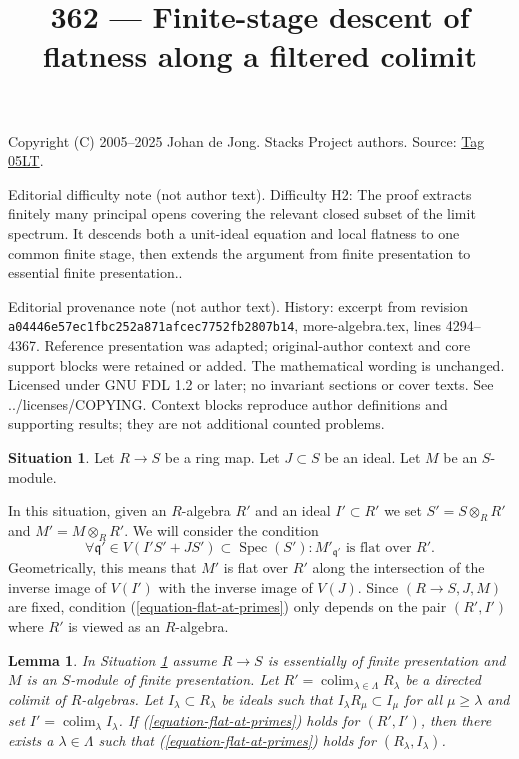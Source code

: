 \documentclass{amsart}
\theoremstyle{plain}
\newtheorem{lemma}[subsection]{Lemma}
\theoremstyle{definition}
\newtheorem{situation}[subsection]{Situation}
\theoremstyle{remark}
\numberwithin{equation}{subsection}
\def\colim{\mathop{\mathrm{colim}}\nolimits}
\def\Spec{\mathop{\mathrm{Spec}}}
\begin{document}
\title[Stacks Project, Tag 05LT]{362 --- Finite-stage descent of flatness along a filtered colimit}
\maketitle
\noindent Copyright (C) 2005--2025 Johan de Jong. Stacks Project authors. Source: \href{https://stacks.math.columbia.edu/tag/05LT}{Tag 05LT}.

\noindent Editorial difficulty note (not author text). Difficulty H2: The proof extracts finitely many principal opens covering the relevant closed subset of the limit spectrum. It descends both a unit-ideal equation and local flatness to one common finite stage, then extends the argument from finite presentation to essential finite presentation..

\noindent Editorial provenance note (not author text). History: excerpt from revision \texttt{a0444\allowbreak 6e57e\allowbreak c1fbc\allowbreak 252a8\allowbreak 71afc\allowbreak ec775\allowbreak 2fb28\allowbreak 07b14}, more-algebra.tex, lines 4294--4367. Reference presentation was adapted; original-author context and core support blocks were retained or added. The mathematical wording is unchanged. Licensed under GNU FDL 1.2 or later; no invariant sections or cover texts. See ../licenses/COPYING. Context blocks reproduce author definitions and supporting results; they are not additional counted problems.

\begin{situation}
\label{situation-flattening-general}
Let $R \to S$ be a ring map. Let $J \subset S$ be an ideal.
Let $M$ be an $S$-module.
\end{situation}

In this situation, given an $R$-algebra $R'$ and an ideal $I' \subset R'$
we set $S' = S \otimes_R R'$ and $M' = M \otimes_R R'$.
We will consider the condition
\begin{equation}
\label{equation-flat-at-primes}
\forall \mathfrak q' \in V(I'S' + JS') \subset \Spec(S') :
M'_{\mathfrak q'}\text{ is flat over }R'.
\end{equation}
Geometrically, this means that $M'$ is flat over $R'$ along the intersection
of the inverse image of $V(I')$ with the inverse image of $V(J)$.
Since $(R \to S, J, M)$ are fixed, condition (\ref{equation-flat-at-primes})
only depends on the pair $(R', I')$ where $R'$ is viewed as an $R$-algebra.


\begin{lemma}
\label{lemma-limit-preserving-flat-at-primes}
In Situation \ref{situation-flattening-general}
assume $R \to S$ is essentially of finite presentation
and $M$ is an $S$-module of finite presentation. Let
$R' = \colim_{\lambda \in \Lambda} R_\lambda$
be a directed colimit of $R$-algebras. Let $I_\lambda \subset R_\lambda$
be ideals such that $I_\lambda R_\mu \subset I_\mu$ for all
$\mu \geq \lambda$ and set $I' = \colim_\lambda I_\lambda$.
If (\ref{equation-flat-at-primes}) holds for
$(R', I')$, then there exists a $\lambda \in \Lambda$ such that
(\ref{equation-flat-at-primes}) holds for $(R_\lambda, I_\lambda)$.
\end{lemma}
\end{document}
